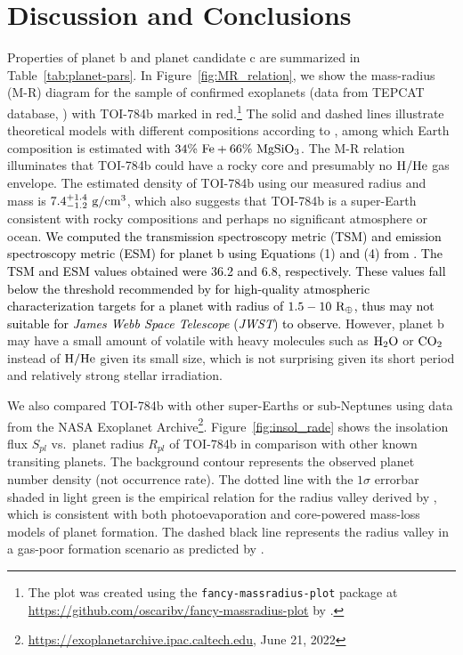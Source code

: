 \documentclass[twocolumn]{aastex631}
\newcommand{\rev}[1]{\textcolor{black}{#1}}
\begin{document}
\section{Discussion and Conclusions}
\label{sec:discussion}

Properties of planet b and planet candidate c are summarized in Table~\ref{tab:planet-pars}. In Figure~\ref{fig:MR_relation}, we show the mass-radius (M-R) diagram for the sample of confirmed exoplanets (data from TEPCAT database, \citealt{Southworth2011}) with TOI-784b marked in red.\footnote{The plot was created using the \texttt{fancy-massradius-plot} package at \url{https://github.com/oscaribv/fancy-massradius-plot} by \cite{Barragan2018}.} The solid and dashed lines illustrate theoretical models with different compositions according to \citet{zeng2016}, among which Earth composition is estimated with $\rm 34\%\ Fe + 66\%\ MgSiO_3$. The M-R relation illuminates that TOI-784b could have a rocky core and presumably no $\rm H/He$ gas envelope. The estimated density of TOI-784b using our measured radius and mass is $7.4^{+1.4}_{-1.2}\ \rm{g/cm^3}$, which also suggests that TOI-784b is a super-Earth consistent with rocky compositions and perhaps no significant atmosphere or ocean. \rev{We computed the transmission spectroscopy metric (TSM) and emission spectroscopy metric (ESM) for planet b using Equations (1) and (4) from \cite{Kempton2018}. The TSM and ESM values obtained were 36.2 and 6.8, respectively. These values fall below the threshold recommended by \cite{Kempton2018} for high-quality atmospheric characterization targets for a planet with radius of $1.5-10\ \rm R_{\oplus}$, thus may not suitable for \textit{James Webb Space Telescope} (\textit{JWST}) to observe.} However, planet b may have a small amount of volatile with heavy molecules such as $\rm H_2O$ or $\rm CO_2$ instead of $\rm H/He$ given its small size, which is not surprising given its short period and relatively strong stellar irradiation.

We also compared TOI-784b with other super-Earths or sub-Neptunes using data from the NASA Exoplanet Archive\footnote{\url{https://exoplanetarchive.ipac.caltech.edu}, June 21, 2022}. Figure~\ref{fig:insol_rade} shows the insolation flux $S_{pl}$ vs.~planet radius $R_{pl}$ of TOI-784b in comparison with other known transiting planets. The background contour represents the observed planet number density (not occurrence rate). The dotted line with the $1\sigma$ errorbar shaded in light green is the empirical relation for the radius valley derived by \citet{Martinez2019}, which is consistent with both photoevaporation and core-powered mass-loss models of planet formation. The dashed black line represents the radius valley in a gas-poor formation scenario as predicted by \citet{Lopez&Rice2018}. 
\end{document}
